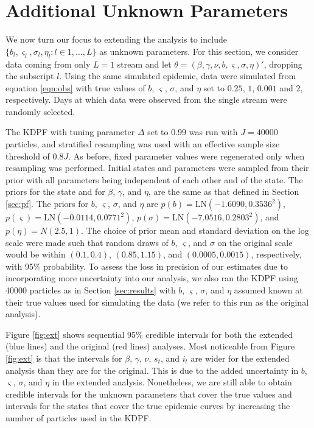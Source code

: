 \documentclass{elsarticle}
\begin{document}
\section{Additional Unknown Parameters \label{sec:extend}}

We now turn our focus to extending the analysis to include $\{b_l,\varsigma_l,\sigma_l,\eta_l:l\in1,\ldots,L\}$ as unknown parameters. For this section, we consider data coming from only $L = 1$ stream and let $\theta = (\beta, \gamma, \nu, b, \varsigma, \sigma, \eta)'$, dropping the subscript $l$. Using the same simulated epidemic, data were simulated from equation \eqref{eqn:obs} with true values of $b$, $\varsigma$, $\sigma$, and $\eta$ set to $0.25$, $1$, $0.001$ and $2$, respectively. Days at which data were observed from the single stream were randomly selected.

The KDPF with tuning parameter $\Delta$ set to 0.99 was run with $J = 40000$ particles, and stratified resampling was used with an effective sample size threshold of $0.8J$. As before, fixed parameter values were regenerated only when resampling was performed. Initial states and parameters were sampled from their prior with all parameters being independent of each other and of the state. The priors for the state and for $\beta$, $\gamma$, and $\eta$, are the same as that defined in Section \ref{sec:pf}. The priors for $b$, $\varsigma$, $\sigma$, and $\eta$ are \hbox{$p(b) = \mbox{LN}(-1.6090, 0.3536^2)$}, \hbox{$p(\varsigma) = \mbox{LN}(-0.0114, 0.0771^2)$}, \hbox{$p(\sigma) = \mbox{LN}(-7.0516, 0.2803^2)$}, and \hbox{$p(\eta) = N(2.5, 1)$}. The choice of prior mean and standard deviation on the log scale were made such that random draws of $b$, $\varsigma$, and $\sigma$ on the original scale would be within $(0.1, 0.4)$, $(0.85, 1.15)$, and $(0.0005, 0.0015)$, respectively, with 95\% probability. To assess the loss in precision of our estimates due to incorporating more uncertainty into our analysis, we also ran the KDPF using 40000 particles as in Section \ref{sec:results} with $b$, $\varsigma$, $\sigma$, and $\eta$ assumed known at their true values used for simulating the data (we refer to this run as the original analysis).

Figure \ref{fig:ext} shows sequential 95\% credible intervals for both the extended (blue lines) and the original (red lines) analyses. Most noticeable from Figure \ref{fig:ext} is that the intervals for $\beta$, $\gamma$, $\nu$, $s_t$, and $i_t$ are wider for the extended analysis than they are for the original. This is due to the added uncertainty in $b$, $\varsigma$, $\sigma$, and $\eta$ in the extended analysis. Nonetheless, we are still able to obtain credible intervals for the unknown parameters that cover the true values and intervals for the states that cover the true epidemic curves by increasing the number of particles used in the KDPF.
\end{document}
